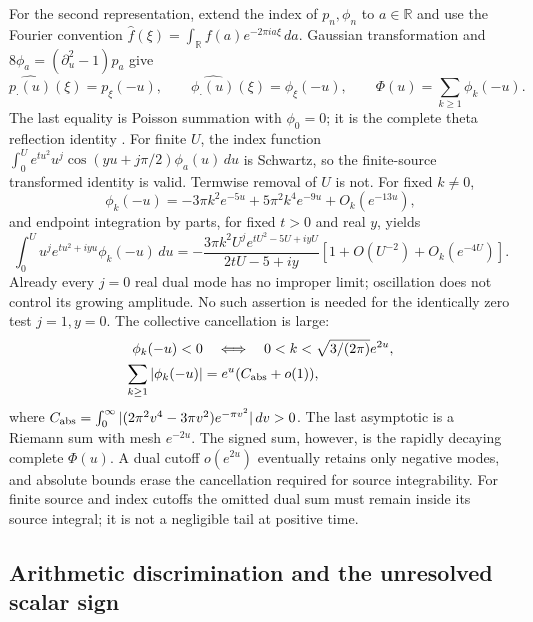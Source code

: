 \documentclass[11pt]{article}
\numberwithin{equation}{section}
\theoremstyle{definition}
\theoremstyle{remark}
\newcommand{\R}{\mathbb R}
\begin{document}
For the second representation, extend the index of $p_n,\phi_n$ to
$a\in\R$ and use the Fourier convention
$\widehat f(\xi)=\int_\R f(a)e^{-2\pi ia\xi}\,da$.
Gaussian transformation and $8\phi_a=(\partial_u^2-1)p_a$ give
\begin{equation}
 \widehat{p_\cdot(u)}(\xi)=p_\xi(-u),\qquad
 \widehat{\phi_\cdot(u)}(\xi)=\phi_\xi(-u),\qquad
 \Phi(u)=\sum_{k\ge1}\phi_k(-u).
 \label{nonlocal:index-poisson}
\end{equation}
The last equality is Poisson summation with $\phi_0=0$; it is the
complete theta reflection identity
\cite[\S1.8(iv), \S20.7(viii)]{DLMF}.
For finite $U$, the index function
$\int_0^U e^{tu^2}u^j\cos(yu+j\pi/2)\phi_a(u)\,du$ is Schwartz,
so the finite-source transformed identity is valid. Termwise removal
of $U$ is not. For fixed $k\ne0$,
\[
 \phi_k(-u)=-3\pi k^2e^{-5u}+5\pi^2k^4e^{-9u}+O_k(e^{-13u}),
\]
and endpoint integration by parts, for fixed $t>0$ and real $y$, yields
\begin{equation}
 \int_0^Uu^je^{tu^2+iyu}\phi_k(-u)\,du
 =-\frac{3\pi k^2U^je^{tU^2-5U+iyU}}{2tU-5+iy}
       [1+O(U^{-2})+O_k(e^{-4U})].
 \label{nonlocal:dual-divergence}
\end{equation}
Already every $j=0$ real dual mode has no improper limit; oscillation
does not control its growing amplitude. No such assertion is needed for
the identically zero test $j=1,y=0$.
The collective cancellation is large:
\begin{equation}
 \begin{aligned}
 \phi_k(-u)<0&\quad\Longleftrightarrow\quad
 0<k<\sqrt{3/(2\pi)}e^{2u},\\
 \sum_{k\ge1}|\phi_k(-u)|&=e^u(C_{\rm abs}+o(1)),
 \end{aligned}
 \label{nonlocal:dual-cancellation}
\end{equation}
where $C_{\rm abs}=\int_0^\infty
|(2\pi^2v^4-3\pi v^2)e^{-\pi v^2}|\,dv>0$.
The last asymptotic is a Riemann sum with mesh $e^{-2u}$.
The signed sum, however, is the rapidly decaying complete $\Phi(u)$.
A dual cutoff $o(e^{2u})$ eventually retains only negative modes, and
absolute bounds erase the cancellation required for source integrability.
For finite source and index cutoffs the omitted dual sum must remain
inside its source integral; it is not a negligible tail at positive time.

\subsection{Arithmetic discrimination and the unresolved scalar sign}
\label{dil:control-discriminator}
\end{document}
